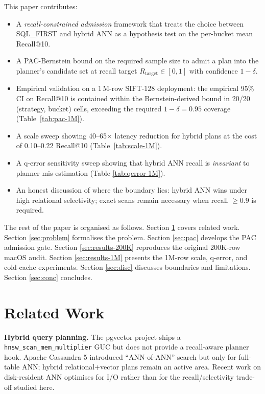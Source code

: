 \documentclass[conference]{IEEEtran}
\begin{document}
This paper contributes:
\begin{itemize}
\item A \emph{recall-constrained admission} framework that treats the
      choice between SQL\_FIRST and hybrid ANN as a hypothesis test
      on the per-bucket mean Recall@10.
\item A PAC-Bernstein bound on the required sample size to admit a
      plan into the planner's candidate set at recall target
      $R_{\text{target}} \in [0, 1]$ with confidence $1 - \delta$.
\item Empirical validation on a 1\,M-row SIFT-128 deployment: the
      empirical 95\% CI on Recall@10 is contained within the
      Bernstein-derived bound in 20/20 (strategy, bucket) cells,
      exceeding the required $1 - \delta = 0.95$ coverage
      (Table~\ref{tab:pac-1M}).
\item A scale sweep showing 40--65$\times$ latency reduction for
      hybrid plans at the cost of 0.10--0.22 Recall@10
      (Table~\ref{tab:scale-1M}).
\item A q-error sensitivity sweep showing that hybrid ANN recall is
      \emph{invariant} to planner mis-estimation (Table
      \ref{tab:qerror-1M}).
\item An honest discussion of where the boundary lies: hybrid ANN
      wins under high relational selectivity; exact scans remain
      necessary when recall $\geq 0.9$ is required.
\end{itemize}

The rest of the paper is organised as follows.  Section
\ref{sec:related} covers related work.  Section \ref{sec:problem}
formalises the problem.  Section \ref{sec:pac} develops the PAC
admission gate.  Section \ref{sec:results-200K} reproduces the
original 200K-row macOS audit.  Section \ref{sec:results-1M}
presents the 1M-row scale, q-error, and cold-cache experiments.
Section \ref{sec:disc} discusses boundaries and limitations.
Section \ref{sec:conc} concludes.

\section{Related Work}
\label{sec:related}
\textbf{Hybrid query planning.}  The pgvector project ships a
\texttt{hnsw\_scan\_mem\_multiplier} GUC but does not provide a
recall-aware planner hook.  Apache Cassandra 5 introduced
``ANN-of-ANN'' search but only for full-table ANN;  hybrid
relational+vector plans remain an active area.  Recent work on
disk-resident ANN optimises for I/O rather than for the
recall/selectivity trade-off studied here.
\end{document}
